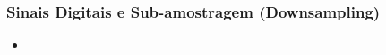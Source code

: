 \begin{frame}
	\frametitle{Sinais Digitais e Sub-amostragem (Downsampling)}
	\begin{itemize}
		\item 
	\end{itemize}
\end{frame}
